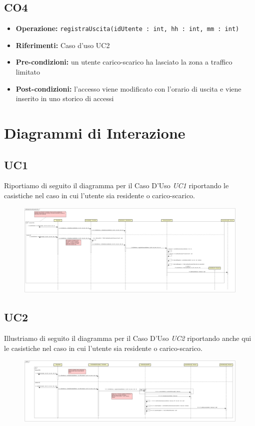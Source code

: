 \documentclass[12pt, letterpaper]{article}
\begin{document}
\subsection{CO4}
\begin{itemize}
    \item \textbf{Operazione:} \texttt{registraUscita(idUtente : int, hh : int, mm : int)}
    \item \textbf{Riferimenti:} Caso d'uso UC2
    \item \textbf{Pre-condizioni:} un utente 
    carico-scarico ha lasciato la zona a traffico 
    limitato
    \item \textbf{Post-condizioni:} l'accesso 
    viene modificato con l'orario di uscita e 
    viene inserito in uno storico di accessi
\end{itemize}

\section{Diagrammi di Interazione}
\subsection{UC1}
Riportiamo di seguito il diagramma per il Caso D'Uso 
\emph{UC1} riportando le casistiche nel caso in cui 
l'utente sia residente o carico-scarico.
\begin{figure}[H]
    \centering
    \includegraphics[scale=0.10]{DI-UC1}
    \label{fig:mesh1}
\end{figure}

\subsection{UC2}
Illustriamo di seguito il diagramma per il Caso D'Uso 
\emph{UC2} riportando anche qui le casistiche nel caso in cui 
l'utente sia residente o carico-scarico.
\begin{figure}[H]
    \centering
    \includegraphics[scale=0.13]{DI-UC2}
    \label{fig:mesh1}
\end{figure}
\end{document}
